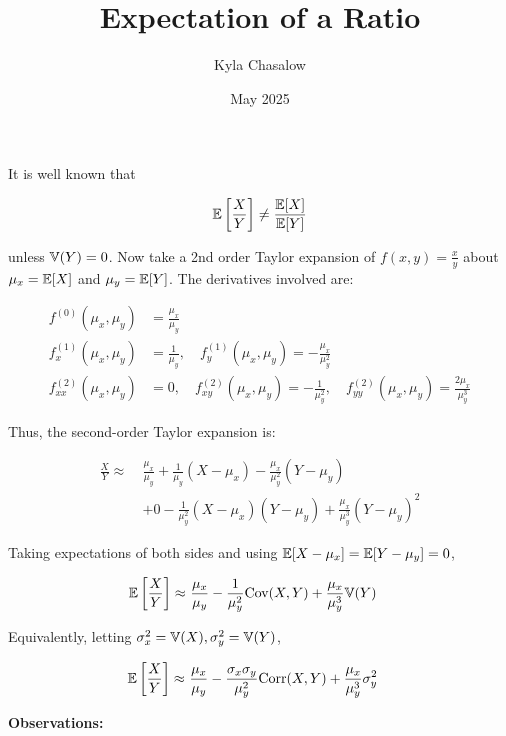\documentclass{article}
\title{Expectation of a Ratio}
\author{Kyla Chasalow}
\date{May 2025}
\begin{document}
\maketitle 

It is well known that 

\[ \mathbb{E}\left[\frac{X}{Y}\right]\neq \frac{\mathbb{E}[X]}{\mathbb{E}[Y]}\]

unless $\mathbb{V}(Y)=0$. Now take a 2nd order Taylor expansion of $f(x,y)=\frac{x}{y}$ about $\mu_x=\mathbb{E}[X]$ and $\mu_y=\mathbb{E}[Y]$. The derivatives involved are:


\begin{align*}
    f^{(0)}(\mu_x,\mu_y) &= \frac{\mu_x}{\mu_y} \\
    f_x^{(1)}(\mu_x,\mu_y) &= \frac{1}{\mu_y}, \quad f_y^{(1)}(\mu_x,\mu_y) = -\frac{\mu_x}{\mu_y^2} \\
    f_{xx}^{(2)}(\mu_x,\mu_y) &= 0, \quad f_{xy}^{(2)}(\mu_x,\mu_y) = -\frac{1}{\mu_y^2}, \quad f_{yy}^{(2)}(\mu_x,\mu_y) = \frac{2\mu_x}{\mu_y^3}
\end{align*}


Thus, the second-order Taylor expansion is:

\begin{align*}
    \frac{X}{Y} \approx\ & \frac{\mu_x}{\mu_y} + \frac{1}{\mu_y}(X - \mu_x) - \frac{\mu_x}{\mu_y^2}(Y - \mu_y) \\
    & + 0 - \frac{1}{\mu_y^2}(X - \mu_x)(Y - \mu_y) + \frac{\mu_x}{\mu_y^3}(Y - \mu_y)^2
\end{align*}

Taking expectations of both sides and using $\mathbb{E}[X-\mu_x]=\mathbb{E}[Y-\mu_y]=0$,

\begin{align*}
    \mathbb{E}\left[\frac{X}{Y}\right] \approx\ & \frac{\mu_x}{\mu_y} - \frac{1}{\mu_y^2} \mbox{Cov}(X, Y) + \frac{\mu_x}{\mu_y^3} \mathbb{V}(Y)
\end{align*}

Equivalently, letting $\sigma_x^2=\mathbb{V}(X),\sigma_y^2=\mathbb{V}(Y)$,

\begin{align*}
    \mathbb{E}\left[\frac{X}{Y}\right] \approx\ & \frac{\mu_x}{\mu_y} - \frac{\sigma_x\sigma_y}{\mu_y^2} \mbox{Corr}(X, Y) + \frac{\mu_x}{\mu_y^3} \sigma_y^2
\end{align*}


\newpage \textbf{Observations:}
\end{document}
